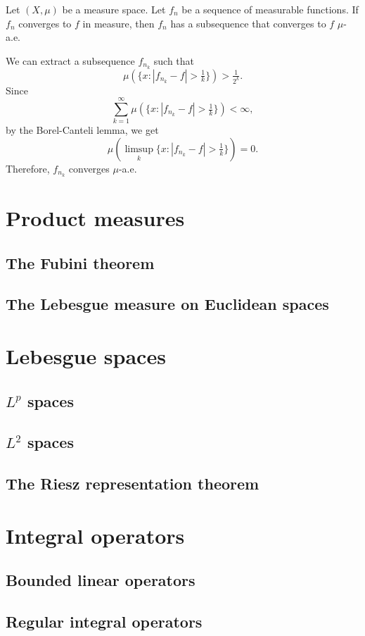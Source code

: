 \documentclass{../note}
\begin{document}
\begin{thm}
Let $(X,\mu)$ be a measure space.
Let $f_n$ be a sequence of measurable functions.
If $f_n$ converges to $f$ in measure, then $f_n$ has a subsequence that converges to $f$ $\mu$-a.e.
\end{thm}
\begin{pf}
We can extract a subsequence $f_{n_k}$ such that
\[\mu(\{x:|f_{n_k}-f|>\tfrac1k\})>\tfrac1{2^k}.\]
Since
\[\sum_{k=1}^\infty\mu(\{x:|f_{n_k}-f|>\tfrac1k\})<\infty,\]
by the Borel-Canteli lemma, we get
\[\mu(\limsup_k\{x:|f_{n_k}-f|>\tfrac1k\})=0.\]
Therefore, $f_{n_k}$ converges $\mu$-a.e.
\end{pf}



\chapter{Product measures}
\section{The Fubini theorem}
\section{The Lebesgue measure on Euclidean spaces}

\chapter{Lebesgue spaces}
\section{$L^p$ spaces}
\section{$L^2$ spaces}
\section{The Riesz representation theorem}

\chapter{Integral operators}
\section{Bounded linear operators}
\section{Regular integral operators}
\end{document}
